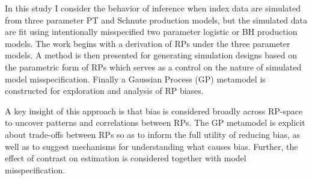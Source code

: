 \documentclass[12pt]{article}
\begin{document}



In this study I consider the behavior of inference when index data are simulated 
from three parameter PT and Schnute production models, but the simulated data are fit 
using intentionally misspecified two parameter logistic or BH production models.
%
The work begins with a derivation of RPs under the three parameter models. %
A method is then presented for generating simulation designs based on the parametric 
form of RPs which serves as a control on the nature of simulated model misspecification.
Finally a Gaussian Process (GP) metamodel  
is constructed for exploration and analysis of RP biases.

%
A key insight of this approach is that bias is considered broadly across RP-space to
uncover patterns and correlations between RPs. %
The GP metamodel is explicit about trade-offs between RPs %
so as to inform the full utility of reducing bias, as well as to suggest mechanisms for
understanding what causes bias. Further, the effect of contrast on estimation
is considered together with model misspecification. %
\end{document}
